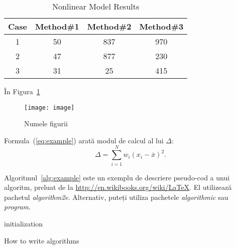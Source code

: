 \begin{table}[t]
\centering                          %
\begin{tabular}{|c|c|c|c|}          %
\hline\hline                        %
Case & Method\#1 & Method\#2 & Method\#3 \\ [0.5ex]   %
\hline                              %
1 & 50 & 837 & 970 \\               %
2 & 47 & 877 & 230 \\
3 & 31 & 25 & 415 \\[1ex]           %
\hline                              
\end{tabular}
\caption{Nonlinear Model Results}   %
\label{table:example}                %
\end{table}

În Figura~\ref{fig:exemplu} 

\begin{figure}
    \centering
    \texttt{[image: image]}
    \caption{Numele figurii}
    \label{fig:exemplu}
\end{figure}


Formula~(\ref{eq:example}) arată modul de calcul al lui $\Delta$:
\begin{equation} \label{eq:example}
    \Delta =\sum_{i=1}^N w_i (x_i - \bar{x})^2 .
\end{equation}


Algoritmul~\ref{alg:example} este un exemplu de descriere pseudo-cod a unui algoritm, preluat de la \href{http://en.wikibooks.org/wiki/LaTeX/Algorithms#Typesetting_using_the_algorithm2e_package}{http://en.wikibooks.org/wiki/LaTeX}. El utilizează pachetul \textit{algorithm2e}. Alternativ, puteți utiliza pachetele \textit{algorithmic} sau \textit{program}. 

\begin{algorithm}
 initialization\;
 \caption{How to write algorithms}
 \label{alg:example}
\end{algorithm}
